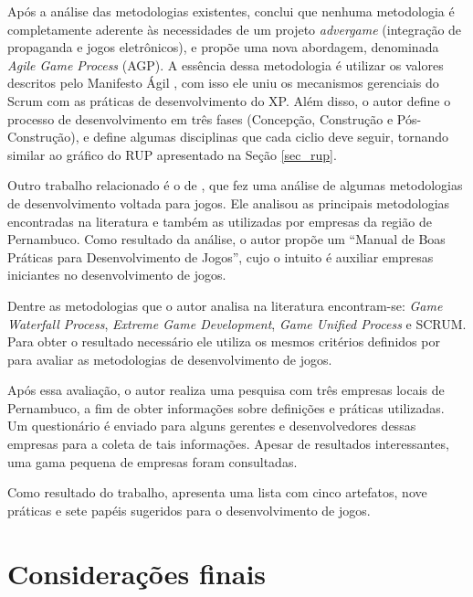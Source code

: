 \documentclass[quali]{ppgccufscar}
\begin{document}
Após a análise das metodologias existentes,  conclui que nenhuma metodologia é completamente aderente às necessidades de um projeto \textit{advergame} (integração de propaganda e jogos eletrônicos), e propõe uma nova abordagem, denominada \textit{Agile Game Process} (AGP). A essência dessa metodologia é utilizar os valores descritos pelo Manifesto Ágil \cite{beck2001}, com isso ele uniu os mecanismos gerenciais do Scrum com as práticas de desenvolvimento do XP. Além disso, o autor define o processo de desenvolvimento em três fases (Concepção, Construção e Pós-Construção), e define algumas disciplinas que cada ciclio deve seguir, tornando similar ao gráfico do RUP apresentado na Seção \ref{sec_rup}.

Outro trabalho relacionado é o de , que fez uma análise de algumas metodologias de desenvolvimento voltada para jogos. Ele analisou as principais metodologias encontradas na literatura e também as utilizadas por empresas da região de Pernambuco. Como resultado da análise, o autor propõe um “Manual de Boas Práticas para Desenvolvimento de Jogos”, cujo o intuito é auxiliar empresas iniciantes no desenvolvimento de jogos.

Dentre as metodologias que o autor analisa na literatura encontram-se: \textit{Game Waterfall Process}, \textit{Extreme Game Development}, \textit{Game Unified Process} e SCRUM. Para obter o resultado necessário ele utiliza os mesmos critérios definidos por  para avaliar as metodologias de desenvolvimento de jogos.

Após essa avaliação, o autor realiza uma pesquisa com três empresas locais de Pernambuco, a fim de obter informações sobre definições e práticas utilizadas. Um questionário é enviado para alguns gerentes e desenvolvedores dessas empresas para a coleta de tais informações. Apesar de resultados interessantes, uma gama pequena de empresas foram consultadas. 

Como resultado do trabalho,  apresenta uma lista com cinco artefatos, nove práticas e sete papéis sugeridos para o desenvolvimento de jogos.

%


\section{Considerações finais}
\end{document}
